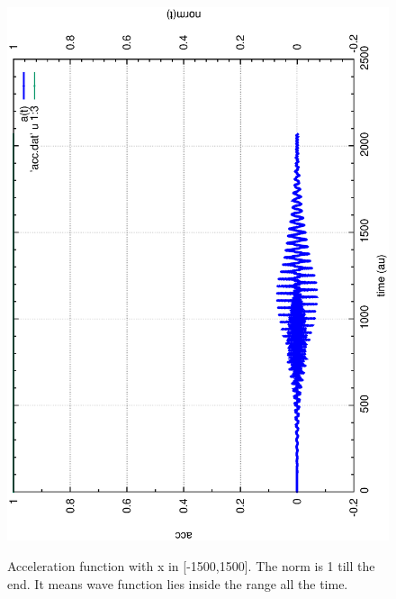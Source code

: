 \documentclass{isildur}
\begin{document}
\begin{itemize}
\begin{figure}[htbp]
{{{\includegraphics[width=\linewidth]{fig2a.eps}} }}
\caption{Acceleration function with x in [-1500,1500]. The norm is 1 till the
end. It means wave function lies inside the range all the time.
 }
\end{figure}
\begin{figure}[htbp]
\centering
\mbox{}
\end{figure}
\end{itemize}
\end{document}
